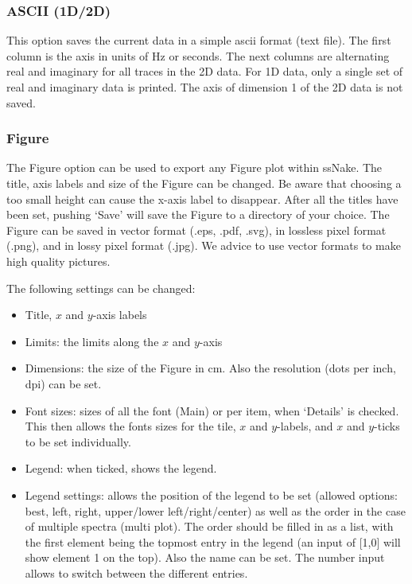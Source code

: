 \documentclass[11pt,a4paper]{article}
\begin{document}
\subsubsection*{ASCII (1D/2D)}
This option saves the current data in a simple ascii format (text file). The first column is the axis in units of Hz or seconds. The next columns are alternating real and imaginary for all traces in the 2D data. For 1D data, only a single set of real and imaginary data is printed. The axis of dimension 1 of the 2D data is not saved.

\subsubsection*{Figure}
The Figure option can be used to export any Figure plot within ssNake. The title, axis labels and size of the
Figure can be changed. Be aware that choosing a too small height can cause the x-axis label to disappear.
After all the titles have been set, pushing `Save' will save the Figure to a directory of your choice. The
Figure can be saved in vector format (.eps, .pdf, .svg), in lossless pixel format (.png), and in lossy pixel
format (.jpg). We advice to use vector formats to make high quality pictures.

The following settings can be changed:
\begin{itemize}
  \item Title, $x$ and $y$-axis labels
  \item Limits: the limits along the $x$ and $y$-axis
  \item Dimensions: the size of the Figure in cm. Also the resolution (dots per inch, dpi) can be set.
  \item Font sizes: sizes of all the font (Main) or per item, when `Details' is checked. This then allows the fonts sizes for the tile, $x$ and $y$-labels, and $x$ and $y$-ticks to be set individually.
  \item Legend: when ticked, shows the legend.
  \item Legend settings: allows the position of the legend to be set (allowed options: best, left, right, upper/lower left/right/center) as well as the order in the case of multiple spectra (multi plot). The order should be filled in as a list, with the first element being the topmost entry in the legend (an input of [1,0] will show element 1 on the top). Also the name can be set. The number input allows to switch between the different entries.
\end{itemize}
\end{document}
